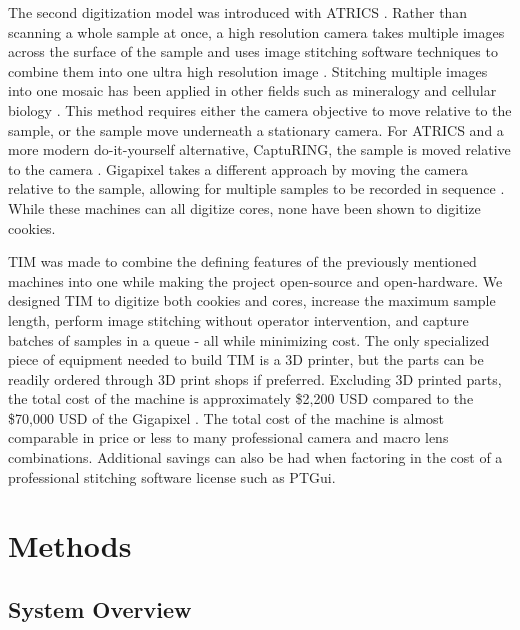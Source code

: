 \documentclass[a4paper,12pt]{article}
\begin{document}
The second digitization model was introduced with ATRICS \citep{levanic_atrics_2007}. 
Rather than scanning a whole sample at once, a high resolution camera takes multiple images across the surface of the sample and uses image stitching software techniques to combine them into one ultra high resolution image \citep{muhlich_stitching_2022}.
Stitching multiple images into one mosaic has been applied in other fields such as mineralogy and cellular biology \citep{ro_image_2021,mohammadi_fast_2024}. 
This method requires either the camera objective to move relative to the sample, or the sample move underneath a stationary camera. 
For ATRICS and a more modern do-it-yourself alternative, CaptuRING, the sample is moved relative to the camera \citep{garcia-hidalgo_capturing_2022}. 
Gigapixel takes a different approach by moving the camera relative to the sample, allowing for multiple samples to be recorded in sequence \citep{griffin_gigapixel_2021}. 
While these machines can all digitize cores, none have been shown to digitize cookies.

TIM was made to combine the defining features of the previously mentioned machines into one while making the project open-source and open-hardware. 
We designed TIM to digitize both cookies and cores, increase the maximum sample length, perform image stitching without operator intervention, and capture batches of samples in a queue - all while minimizing cost. 
The only specialized piece of equipment needed to build TIM is a 3D printer, but the parts can be readily ordered through 3D print shops if preferred.
Excluding 3D printed parts, the total cost of the machine is approximately \$2,200 USD compared to the \$70,000 USD of the Gigapixel \citep{griffin_gigapixel_2021}.
The total cost of the machine is almost comparable in price or less to many professional camera and macro lens combinations.
Additional savings can also be had when factoring in the cost of a professional stitching software license such as PTGui. 

\section{Methods}

\subsection{System Overview} %
\end{document}
